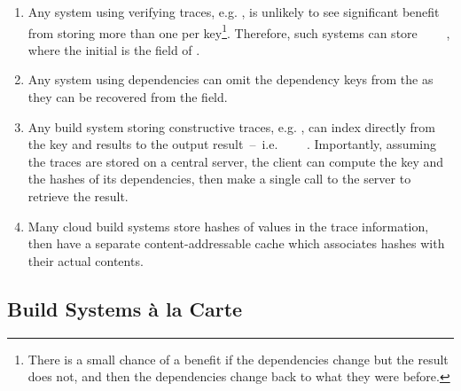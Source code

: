 \begin{enumerate}
\item Any system using verifying traces, e.g. \Shake, is unlikely to see
significant benefit from storing more than one  per key\footnote{There
is a small chance of a benefit if the dependencies change but the result does
not, and then the dependencies change back to what they were before.}.
Therefore, such systems can store ~~~~,
where the initial  is the  field of .

\item Any system using  dependencies can omit the dependency
keys from the  as they can be recovered from the  field.

\item Any  build system storing constructive traces, e.g.
\Bazel, can index directly from the key and results to the output result~--~i.e.
~~\hs{[Hash}~\hs{v])}~. Importantly, assuming the traces
are stored on a central server, the client can compute the key and the hashes of
its dependencies, then make a single call to the server to retrieve the result.

\item Many cloud build systems store hashes of values in the trace information,
then have a separate content-addressable cache which associates hashes with
their actual contents.
\end{enumerate}

\subsection{Build Systems \`a la Carte}\label{sec-design-space}

